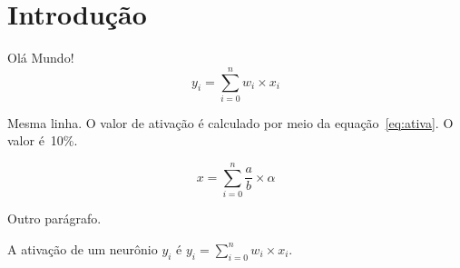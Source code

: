 \documentclass[a4paper, 12pt]{article}
\author{Luciano Senger}
\begin{document}
	\maketitle
\section{Introdução}
Olá       Mundo!
\begin{equation}
	y_i = \sum_{i=0}^{n} w_i \times x_i
\end{equation}\label{eq:teste}


Mesma linha.
O valor de ativação é calculado por meio da equação~\ref{eq:ativa}.
O valor é~10\%.

\begin{equation}
 x = \sum_{i=0}^{n} \frac{a}{b} \times \alpha
\end{equation}\label{eq:ativa}




Outro parágrafo.

A ativação de um neurônio $y_i$ é $y_i = \sum_{i=0}^{n} w_i \times x_i$. 
\end{document}
